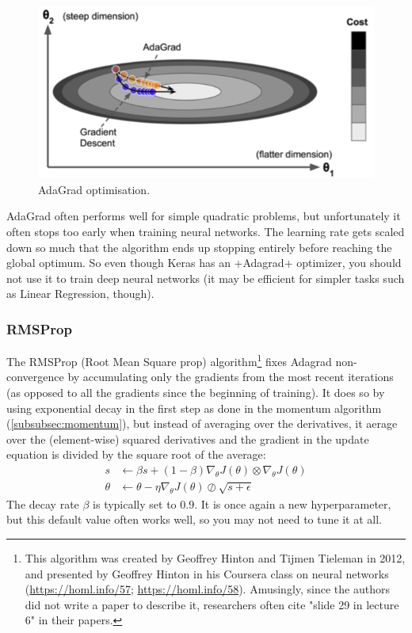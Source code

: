 \begin{figure}
\centering
\includegraphics[scale=0.5]{img/adagrad}
\caption{AdaGrad optimisation.}
\label{fig:adagrad}
\end{figure}
AdaGrad often performs well for simple quadratic problems, but unfortunately it often stops too early when training neural networks. The learning rate gets scaled down so much that the algorithm ends up stopping entirely before reaching the global optimum. So even though Keras has an \cd+Adagrad+ optimizer, you should not use it to train deep neural networks (it may be efficient for simpler tasks such as Linear Regression, though). 

\subsubsection{RMSProp}
\label{subsec:RMSprop}
The RMSProp (Root Mean Square prop) algorithm\footnote{This algorithm was created by Geoffrey Hinton and Tijmen Tieleman in 2012, and presented by Geoffrey Hinton in his Coursera class on neural networks (\href{slides}{https://homl.info/57}; \href{video}{https://homl.info/58}). Amusingly, since the authors did not write a paper to describe it, researchers often cite "slide 29 in lecture 6" in their papers.} fixes Adagrad non-convergence by accumulating only the gradients from the most recent iterations (as opposed to all the gradients since the beginning of training). It does so by using exponential decay in the first step as done in the momentum algorithm (\autoref{subsubsec:momentum}), but instead of averaging over the derivatives, it aerage over the (element-wise) squared derivatives and the gradient in the update equation is divided by the square root of the average:
\begin{equation}
\begin{aligned}
s &\leftarrow \beta s + (1-\beta) \nabla_\theta J(\theta) \otimes \nabla_\theta J(\theta)\\
\theta &\leftarrow \theta - \eta \nabla_\theta J(\theta) \oslash \sqrt{s+\epsilon}
\end{aligned}
\end{equation}
The decay rate $\beta$ is typically set to $0.9$. It is once again a new hyperparameter, but this default value often works well, so you may not need to tune it at all.

